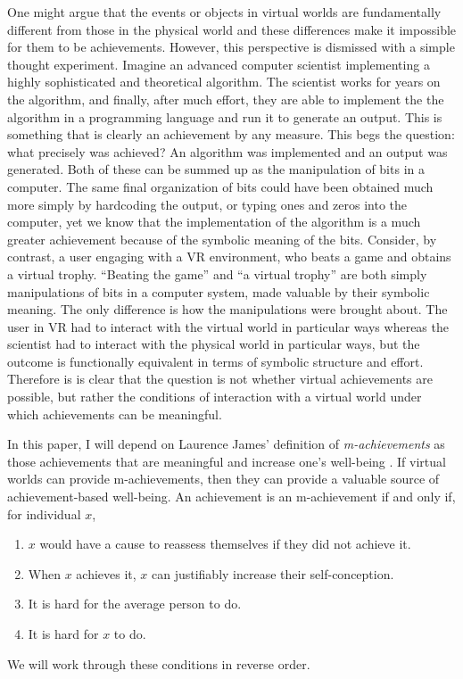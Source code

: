 One might argue that the events or objects in virtual worlds are fundamentally
different from those in the physical world and these differences make it
impossible for them to be achievements. However, this perspective is dismissed
with a simple thought experiment. Imagine an advanced computer scientist 
implementing a highly sophisticated and theoretical algorithm. The scientist
works for years on the algorithm, and finally, after much effort, they are able
to implement the the algorithm in a programming language and run it to generate
an output. This is something that is clearly an achievement by any measure. This
begs the question: what precisely was achieved? An algorithm was implemented and
an output was generated. Both of these can be summed up as the manipulation of
bits in a computer. The same final organization of bits could have been obtained
much more simply by hardcoding the output, or typing ones and zeros into the
computer, yet we know that the implementation of the algorithm is a much greater
achievement because of the symbolic meaning of the bits. Consider, by contrast,
a user engaging with a VR environment, who beats a game and obtains a virtual
trophy. ``Beating the game'' and ``a virtual trophy'' are both simply
manipulations of bits in a computer system, made valuable by their symbolic
meaning. The only difference is how the manipulations were brought about. The
user in VR had to interact with the virtual world in particular ways whereas the
scientist had to interact with the physical world in particular ways, but the
outcome is functionally equivalent in terms of symbolic structure and effort.
Therefore is is clear that the question is not whether virtual achievements are
possible, but rather the conditions of interaction with a virtual world under
which achievements can be meaningful.

In this paper, I will depend on Laurence James' definition of
\emph{m-achievements} as those achievements that are meaningful and increase
one's well-being \citep{James2005}. If virtual worlds can provide m-achievements,
then they can provide a valuable source of achievement-based well-being. An
achievement is an m-achievement if and only if, for individual $x$,
\begin{enumerate}
    \item $x$ would have a cause to reassess themselves if they did not achieve
          it.
    \item When $x$ achieves it, $x$ can justifiably increase their
          self-conception.
    \item It is hard for the average person to do.
    \item It is hard for $x$ to do.
\end{enumerate}
We will work through these conditions in reverse order.

